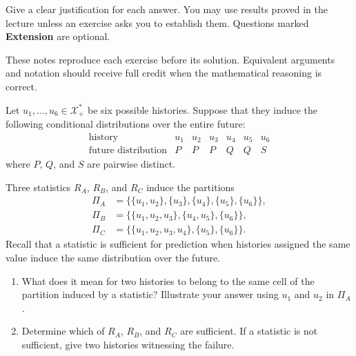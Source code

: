 \documentclass[11pt]{article}
\begin{document}
\begin{callout}[note][Instructions]
    Give a clear justification for each answer. You may use results proved in
    the lecture unless an exercise asks you to establish them. Questions marked
    \textbf{Extension} are optional.
\end{callout}

\begin{solutionsonly}
\begin{callout}[note][Instructions]
    These notes reproduce each exercise before its solution. Equivalent
    arguments and notation should receive full credit when the mathematical
    reasoning is correct.
\end{callout}
\end{solutionsonly}

\begin{exercise}
\label{ex:p2-1}
  Let $u_1,\ldots,u_6\in\mathcal X_+^*$ be six possible histories. Suppose
  that they induce the following conditional distributions over the entire
  future:
  \[
    \begin{array}{c|cccccc}
      \text{history} & u_1 & u_2 & u_3 & u_4 & u_5 & u_6\\
      \hline
      \text{future distribution} & P & P & P & Q & Q & S
    \end{array}
  \]
  where $P$, $Q$, and $S$ are pairwise distinct.

  Three statistics $R_A$, $R_B$, and $R_C$ induce the partitions
  \[
    \begin{aligned}
      \Pi_A
        &=\bigl\{\{u_1,u_2\},\{u_3\},\{u_4\},\{u_5\},\{u_6\}\bigr\},\\
      \Pi_B
        &=\bigl\{\{u_1,u_2,u_3\},\{u_4,u_5\},\{u_6\}\bigr\},\\
      \Pi_C
        &=\bigl\{\{u_1,u_2,u_3,u_4\},\{u_5\},\{u_6\}\bigr\}.
    \end{aligned}
  \]
  Recall that a statistic is sufficient for prediction when histories assigned
  the same value induce the same distribution over the future.

  \begin{enumerate}
    \item What does it mean for two histories to belong to the same cell of the
      partition induced by a statistic? Illustrate your answer using $u_1$ and
      $u_2$ in $\Pi_A$.

    \item Determine which of $R_A$, $R_B$, and $R_C$ are sufficient. If a
      statistic is not sufficient, give two histories witnessing the failure.


\end{enumerate}
\end{exercise}
\end{document}
